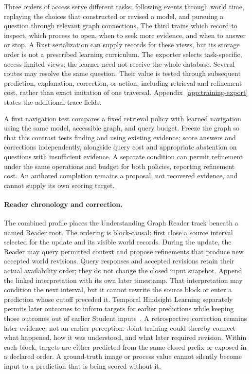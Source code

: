 \documentclass[10pt]{article}
\begin{document}
Three orders of access serve different tasks: following events through world
time, replaying the choices that constructed or revised a model, and pursuing
a question through relevant graph connections. The third trains which record
to inspect, which process to open, when to seek more evidence, and when to
answer or stop. A Rust serialization can supply records for these views, but
its storage order is not a prescribed learning curriculum. The exporter
selects task-specific, access-limited views; the learner need not receive the
whole database. Several routes may resolve the same question. Their value is
tested through subsequent prediction, explanation, correction, or action,
including retrieval and refinement cost, rather than exact imitation of one
traversal. Appendix~\ref{app:training-export} states the additional trace fields.

A first navigation test compares a fixed retrieval policy with learned
navigation using the same model, accessible graph, and query budget. Freeze
the graph so that this contrast tests finding and using existing evidence;
score answers and corrections independently, alongside query cost and
appropriate abstention on questions with insufficient evidence. A separate
condition can permit refinement under the same operations and budget for both
policies, reporting refinement cost. An authored completion remains a proposal,
not recovered evidence, and cannot supply its own scoring target.

\paragraph{Reader chronology and correction.}
The combined profile places the Understanding Graph Reader track beneath
a named Reader root. The ordering is block-causal: first close a source
interval selected for the update and its visible world records. During the
update, the Reader may query permitted context and propose refinements that
produce new accepted world revisions. Query responses and accepted revisions
retain their actual availability order; they do not change the closed input
snapshot. Append the linked interpretation with its own later timestamp.
That interpretation may condition
the next interval, but it cannot rewrite the source block or enter a
prediction whose cutoff preceded it. Temporal Hindsight Learning separately permits later outcomes
to inform targets for earlier predictions while keeping those outcomes out of
earlier Student inputs~\cite{westerbergTHL2026}. A retrospective correction
remains later evidence, not an earlier perception. Joint training could thereby
connect what happened, how it was understood, and what later required revision.
Within each block, targets are either predicted from the same closed prefix
or exposed in a declared order. A ground-truth image or process value cannot
silently become input to a prediction that is being scored without it.
\end{document}
